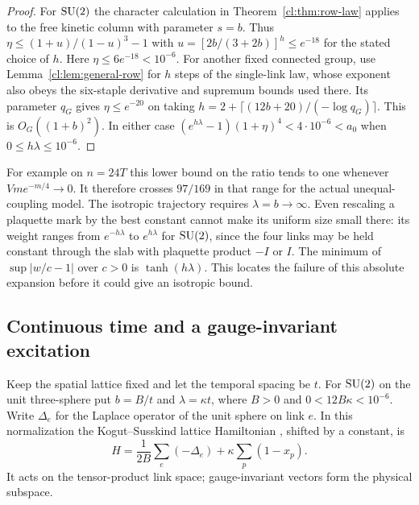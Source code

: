 \begin{proof}
For $\mathrm{SU}(2)$ the character calculation in Theorem~\ref{cl:thm:row-law}
applies to the free kinetic column with parameter $s=b$. Thus
$\eta\le(1+u)/(1-u)^3-1$ with $u=[2b/(3+2b)]^h\le e^{-18}$ for
the stated choice of $h$. Here $\eta\le6e^{-18}<10^{-6}$.
For another fixed connected group, use Lemma~\ref{cl:lem:general-row}
for $h$ steps of the single-link law, whose exponent also obeys the
six-staple derivative and supremum bounds used there. Its parameter
$q_G$ gives $\eta\le e^{-20}$ on taking
$h=2+\lceil(12b+20)/(-\log q_G)\rceil$. This is $O_G((1+b)^2)$.
In either case $(e^{h\lambda}-1)(1+\eta)^4<4\cdot10^{-6}<a_0$
when $0\le h\lambda\le10^{-6}$.
\end{proof}

For example on $n=24T$ this lower bound on the ratio tends to one
whenever $Vm e^{-m/4}\to0$. It therefore crosses $97/169$ in that
range for the actual unequal-coupling model. The isotropic trajectory
requires $\lambda=b\to\infty$. Even rescaling a plaquette mark by the
best constant cannot make its uniform size small there: its weight
ranges from $e^{-h\lambda}$ to $e^{h\lambda}$ for $\mathrm{SU}(2)$, since
the four links may be held constant through the slab with plaquette
product $-I$ or $I$. The minimum of $\sup|w/c-1|$ over $c>0$ is
$\tanh(h\lambda)$. This locates the failure of this absolute expansion
before it could give an isotropic bound.

\subsection{Continuous time and a gauge-invariant excitation}
\label{cl:sec:electric-hamiltonian}
Keep the spatial lattice fixed and let the temporal spacing be $t$.
For $\mathrm{SU}(2)$ on the unit three-sphere put $b=B/t$ and $\lambda=\kappa t$,
where $B>0$ and $0<12B\kappa<10^{-6}$. Write $\Delta_e$ for the
Laplace operator of the unit sphere on link $e$. In this normalization
the Kogut--Susskind lattice Hamiltonian \cite{KS75}, shifted by a constant, is
\[
 H=\frac1{2B}\sum_e(-\Delta_e)+\kappa\sum_p(1-x_p).
\]
It acts on the tensor-product link space; gauge-invariant vectors form
the physical subspace.

